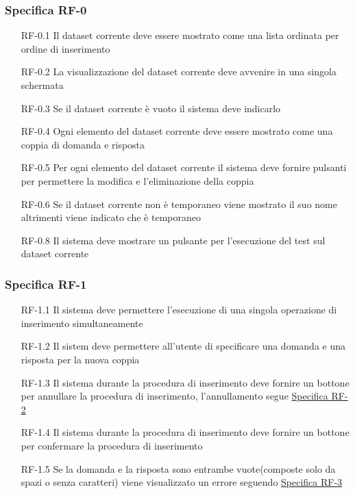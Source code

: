\subsubsection{Specifica RF-0}
\label{subsubsec:RF-0}
\begin{enumerate}
    \item[RF-0.1] Il dataset corrente deve essere mostrato come una lista ordinata per ordine di inserimento
    \item[RF-0.2] La visualizzazione del dataset corrente deve avvenire in una singola schermata
    \item[RF-0.3] Se il dataset corrente è vuoto il sistema deve indicarlo
    \item[RF-0.4] Ogni elemento del dataset corrente deve essere mostrato come una coppia di domanda e risposta 
    \item[RF-0.5] Per ogni elemento del dataset corrente il sistema deve fornire pulsanti per permettere la modifica e l'eliminazione della coppia
    \item[RF-0.6] Se il dataset corrente non è temporaneo viene mostrato il suo nome altrimenti viene indicato che è temporaneo
    \item[RF-0.8] Il sistema deve mostrare un pulsante per l'esecuzione del test sul dataset corrente
\end{enumerate}

\subsubsection{Specifica RF-1}
\label{subsubsec:RF-1}
\begin{enumerate}
    \item[RF-1.1] Il sistema deve permettere l'esecuzione di una singola operazione di inserimento simultaneamente
    \item[RF-1.2] Il sistem deve permettere all'utente di specificare una domanda e una risposta per la nuova coppia
    \item[RF-1.3] Il sistema durante la procedura di inserimento deve fornire un bottone per annullare la procedura di inserimento, l'annullamento segue \hyperref[subsubsec:RF-2]{Specifica RF-2}
    \item[RF-1.4] Il sistema durante la procedura di inserimento deve fornire un bottone per confermare la procedura di inserimento
    \item[RF-1.5] Se la domanda e la risposta sono entrambe vuote(composte solo da spazi o senza caratteri) viene visualizzato un errore seguendo \hyperref[subsubsec:RF-3]{Specifica RF-3}
\end{enumerate}

